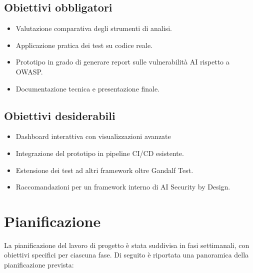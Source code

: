 \subsection{Obiettivi obbligatori}
\begin{itemize}
\item Valutazione comparativa degli strumenti di analisi.
\item Applicazione pratica dei test su codice reale.
\item Prototipo in grado di generare report sulle vulnerabilità AI rispetto a OWASP.
\item Documentazione tecnica e presentazione finale.
\end{itemize}

\subsection{Obiettivi desiderabili}
\begin{itemize}
\item Dashboard interattiva con visualizzazioni avanzate
\item Integrazione del prototipo in pipeline CI/CD esistente.
\item Estensione dei test ad altri framework oltre Gandalf Test.
\item Raccomandazioni per un framework interno di AI Security by Design.
\end{itemize}

\section{Pianificazione}

La pianificazione del lavoro di progetto è stata suddivisa in fasi settimanali, con obiettivi specifici per ciascuna fase. Di seguito è riportata una panoramica della pianificazione prevista:

